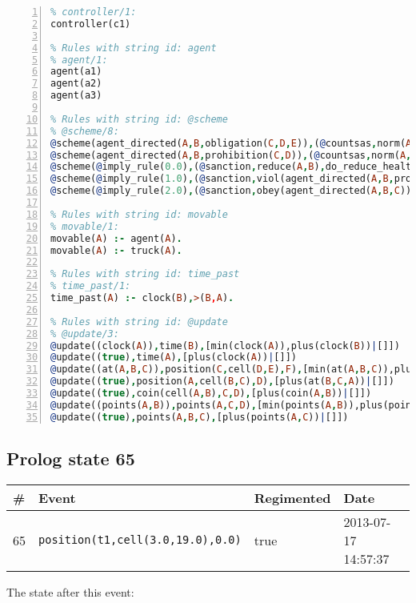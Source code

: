 \documentclass[11pt]{article}\usepackage[utf8]{inputenc}\usepackage{geometry}
\begin{document}
\begin{lstlisting}[language=Prolog, numbers=left]
% Rules with string id: controller
% controller/1:
controller(c1)

% Rules with string id: agent
% agent/1:
agent(a1)
agent(a2)
agent(a3)

% Rules with string id: @scheme
% @scheme/8:
@scheme(agent_directed(A,B,obligation(C,D,E)),(@countsas,norm(A,B,F,obligation(C,D,E)),F),false,(listTrue(C)),(time_past(D)),false,[plus(viol(agent_directed(A,B,obligation(C,D,E))))|[]],[plus(obey(agent_directed(A,B,obligation(C,D,E))))|[]])
@scheme(agent_directed(A,B,prohibition(C,D)),(@countsas,norm(A,B,E,prohibition(C,D)),E),(listTrue(C)),false,(false),false,[plus(viol(agent_directed(A,B,prohibition(C,D))))|[]],[plus(obey(agent_directed(A,B,prohibition(C,D))))|[]])
@scheme(@imply_rule(0.0),(@sanction,reduce(A,B),do_reduce_health(A,B),notifyAgent(A,changed(status))),true,false,false,false,[min(reduce(A,B))|[]],[])
@scheme(@imply_rule(1.0),(@sanction,viol(agent_directed(A,B,prohibition(C,D))),do_sanction(D)),true,false,false,false,[min(viol(agent_directed(A,B,prohibition(C,D))))|[]],[])
@scheme(@imply_rule(2.0),(@sanction,obey(agent_directed(A,B,C))),true,false,false,false,[min(obey(agent_directed(A,B,C)))|[]],[])

% Rules with string id: movable
% movable/1:
movable(A) :- agent(A).
movable(A) :- truck(A).

% Rules with string id: time_past
% time_past/1:
time_past(A) :- clock(B),>(B,A).

% Rules with string id: @update
% @update/3:
@update((clock(A)),time(B),[min(clock(A)),plus(clock(B))|[]])
@update((true),time(A),[plus(clock(A))|[]])
@update((at(A,B,C)),position(C,cell(D,E),F),[min(at(A,B,C)),plus(at(D,E,C))|[]])
@update((true),position(A,cell(B,C),D),[plus(at(B,C,A))|[]])
@update((true),coin(cell(A,B),C,D),[plus(coin(A,B))|[]])
@update((points(A,B)),points(A,C,D),[min(points(A,B)),plus(points(A,D))|[]])
@update((true),points(A,B,C),[plus(points(A,C))|[]])

\end{lstlisting}
\clearpage 
\subsection{Prolog state 65}
\begin{table}[ht]
\centering 
\begin{tabular}{l l l l} 
\textbf{\#} & \textbf{Event} & \textbf{Regimented} & \textbf{Date} \\ [0.5ex] 
\hline
65&\texttt{position(t1,cell(3.0,19.0),0.0)}&true&2013-07-17 14:57:37\\ [1ex] \hline\end{tabular}
\end{table}
The state after this event:
\end{document}
